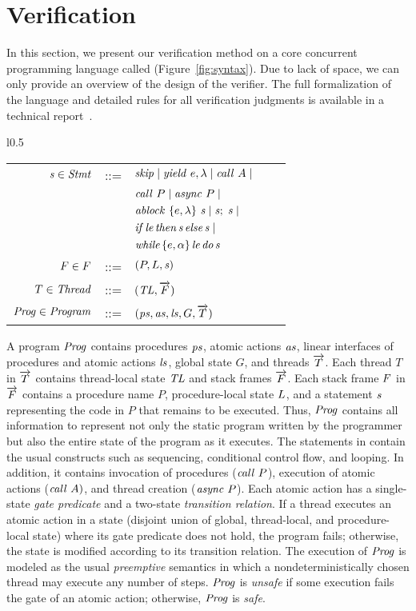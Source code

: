 \section{Verification}
\label{sec:verification}

In this section, we present our verification method on a core concurrent programming language called \civl (Figure~\ref{fig:syntax}).
Due to lack of space, we can only provide an overview of the design of the \civl verifier.
The full formalization of the language and detailed rules for all verification judgments is available in a technical report~\cite{gc-techreport}.

\begin{wrapfigure}[10]{l}{0.5\textwidth}
\setlength{\tabcolsep}{3pt}
\scriptsize{
\begin{tabular}{rclcl}
$\mathit{s} \in \mathit{Stmt}$ &::= & $\mathit{skip} \mid \mathit{yield}\ e,\lambda \mid \mathit{call}\ A \mid$ \\
                  & & $\mathit{call}\ P \mid \mathit{async}\ P \mid$ \\
                  & & $\mathit{ablock}\ {\{e,\lambda\}}\ {\mathit{s}} \mid \mathit{s};\;\mathit{s} \mid$\\
                  & & $\mathit{if}\hspace{0.5mm}{\mathit{le}}\hspace{0.5mm}\mathit{then}\hspace{0.5mm}{\mathit{s}}\hspace{0.5mm}\mathit{else}\hspace{0.5mm}{\mathit{s}} \mid$ \\
                  & & $\mathit{while}\hspace{0.5mm}\{e,\alpha\}\hspace{0.5mm}{\mathit{le}}\hspace{0.5mm}\mathit{do}\hspace{0.5mm}{\mathit{s}}$ \\
$F \in F$ &::= & $(P, L, \mathit{s})$ \\
$T \in \mathit{Thread}$ &::= & $(\mathit{TL}, \overrightarrow{F})$ \\
$\mathit{Prog} \in \mathit{Program}$ &::= & $(\mathit{ps}, \mathit{as}, \mathit{ls}, G, \overrightarrow{T})$
\end{tabular}
}
\caption{Syntax}
\label{fig:syntax}
\end{wrapfigure}
A \civl program $\mathit{Prog}$ contains procedures $\mathit{ps}$, atomic actions $\mathit{as}$, linear interfaces of procedures and atomic actions $\mathit{ls}$,
global state $G$, and threads $\overrightarrow{T}$.
Each thread $T$ in $\overrightarrow{T}$ contains thread-local state $\mathit{TL}$ and stack frames $\overrightarrow{F}$.
Each stack frame $F$ in $\overrightarrow{F}$ contains a procedure name $P$, procedure-local state $L$, and a statement $\mathit{s}$
representing the code in $P$ that remains to be executed.
Thus, $\mathit{Prog}$ contains all information to represent not only the static program 
written by the programmer but also the entire state of the program as it executes.
The statements in \civl contain the usual constructs such as sequencing, conditional control flow, and looping.
In addition, it contains invocation of procedures ($\mathit{call}\ P$), execution of atomic actions ($\mathit{call}\ A)$, and thread creation ($\mathit{async}\ P$).
Each atomic action has a single-state {\em gate predicate\/} and a two-state {\em transition relation\/}.
If a thread executes an atomic action in a state (disjoint union of global, thread-local, and procedure-local state) 
where its gate predicate does not hold, the program fails;
otherwise, the state is modified according to its transition relation.
The execution of $\mathit{Prog}$ is modeled as the usual {\em preemptive\/} semantics in which a
nondeterministically chosen thread may execute any number of steps.
$\mathit{Prog}$ is {\em unsafe\/} if some execution fails the gate of an atomic action;
otherwise, $\mathit{Prog}$ is {\em safe\/}.

